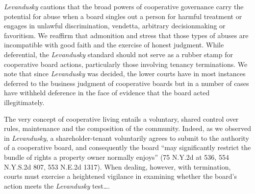\textit{Levandusky} cautions that the broad powers of cooperative governance
carry the potential for abuse when a board singles out a person for harmful
treatment or engages in unlawful discrimination, vendetta, arbitrary
decisionmaking or favoritism. We reaffirm that admonition and stress that those
types of abuses are incompatible with good faith and the exercise of honest
judgment. While deferential, the \textit{Levandusky} standard should not serve
as a rubber stamp for cooperative board actions, particularly those involving
tenancy terminations. We note that since \textit{Levandusky} was decided, the
lower courts have in most instances deferred to the business judgment of
cooperative boards but in a number of cases have withheld deference in the face
of evidence that the board acted illegitimately.

The very concept of cooperative living entails a voluntary, shared control over
rules, maintenance and the composition of the community. Indeed, as we observed
in \textit{Levandusky}, a shareholder-tenant voluntarily agrees to submit to the
authority of a cooperative board, and consequently the board ``may significantly
restrict the bundle of rights a property owner normally enjoys'' (75 N.Y.2d at
536, 554 N.Y.S.2d 807, 553 N.E.2d 1317). When dealing, however, with
termination, courts must exercise a heightened vigilance in examining whether
the board's action meets the \textit{Levandusky} test\ldots .

